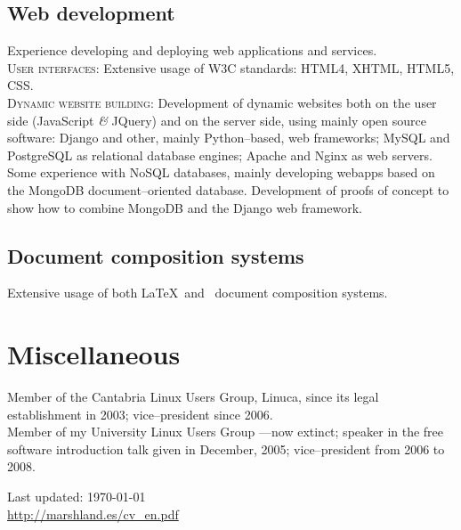 \documentclass[11pt, a4paper]{article}
\newcommand{\amper}
           {{\fontspec[Scale=.95]
                      {Adobe Caslon Pro}\selectfont\itshape\&}}
\begin{document}
\subsection*{Web development}
\noindent
	Experience developing and deploying web applications and services.\\
	\textsc{User interfaces}: Extensive usage of W3C standards: HTML4, XHTML, HTML5, CSS.\\
	\textsc{Dynamic website building}: Development of dynamic websites both on the user side (JavaScript \amper{} JQuery) and on the server side, using mainly open source software: Django and other, mainly Python--based, web frameworks; MySQL and PostgreSQL as relational database engines; Apache and Nginx as web servers.\\
	Some experience with NoSQL databases, mainly developing webapps based on the MongoDB document--oriented database. Development of proofs of concept to show how to combine MongoDB and the Django web framework.
\subsection*{Document composition systems}
\noindent
	Extensive usage of both \LaTeX\ and \XeTeX\ document composition systems.


\section*{Miscellaneous} %
\noindent
Member of the Cantabria Linux Users Group, Linuca, since its legal establishment in 2003; vice--president since 2006.\\
Member of my University Linux Users Group ---now extinct; speaker in the free software introduction talk given in December, 2005; vice--president from 2006 to 2008.


\vfill{}
\hrulefill


\begin{center}
{\scriptsize
	Last updated: \today \\
	\href{http://marshland.es/cv_en.pdf}
	     {http://marshland.es/cv\_en.pdf}
}
\end{center}
\end{document}
